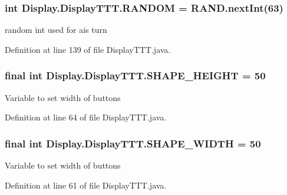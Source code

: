 \subsubsection[{R\+A\+N\+D\+O\+M}]{\setlength{\rightskip}{0pt plus 5cm}int Display.\+Display\+T\+T\+T.\+R\+A\+N\+D\+O\+M = R\+A\+N\+D.\+next\+Int(63)\hspace{0.3cm}{\ttfamily [private]}}\label{class_display_1_1_display_t_t_t_a30415017d1d80126ca6295a1d711684d}
random int used for ai\textquotesingle{}s turn 

Definition at line 139 of file Display\+T\+T\+T.\+java.

\hypertarget{class_display_1_1_display_t_t_t_ad7c69ef4532bf358596b4a2d09c22fbc}{}
\subsubsection[{S\+H\+A\+P\+E\+\_\+\+H\+E\+I\+G\+H\+T}]{\setlength{\rightskip}{0pt plus 5cm}final int Display.\+Display\+T\+T\+T.\+S\+H\+A\+P\+E\+\_\+\+H\+E\+I\+G\+H\+T = 50}\label{class_display_1_1_display_t_t_t_ad7c69ef4532bf358596b4a2d09c22fbc}
Variable to set width of buttons 

Definition at line 64 of file Display\+T\+T\+T.\+java.

\hypertarget{class_display_1_1_display_t_t_t_aba4c92bd721d0fb8718fbf9ed9d837e4}{}
\subsubsection[{S\+H\+A\+P\+E\+\_\+\+W\+I\+D\+T\+H}]{\setlength{\rightskip}{0pt plus 5cm}final int Display.\+Display\+T\+T\+T.\+S\+H\+A\+P\+E\+\_\+\+W\+I\+D\+T\+H = 50}\label{class_display_1_1_display_t_t_t_aba4c92bd721d0fb8718fbf9ed9d837e4}
Variable to set width of buttons 

Definition at line 61 of file Display\+T\+T\+T.\+java.

\hypertarget{class_display_1_1_display_t_t_t_a72b67bc50aa6ba47ae9d398e597c49bb}{}
